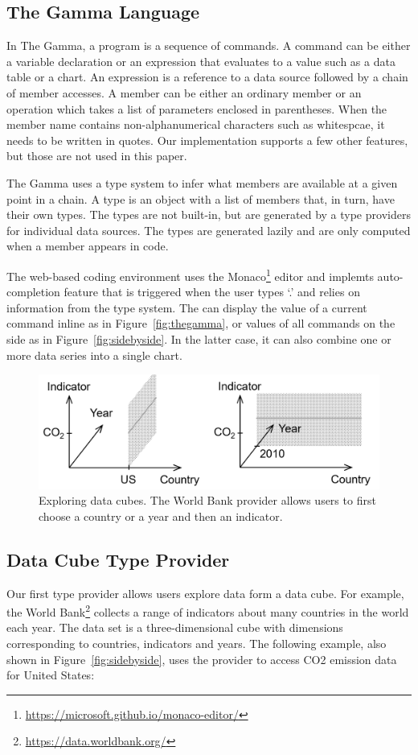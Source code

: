 \documentclass{sigchi}
\begin{document}
\subsection{The Gamma Language}
In The Gamma, a program is a sequence of commands. A command can be either a variable declaration
or an expression that evaluates to a value such as a data table or a chart.
An expression is a reference to a data source followed by a chain of member accesses.
A member can be either an ordinary member or an operation which takes a list of parameters
enclosed in parentheses. When the member name contains non-alphanumerical characters such as
whitespcae, it needs to be written in quotes. Our implementation supports a few other features,
but those are not used in this paper.

The Gamma uses a type system to infer what members are available at a given point in a chain.
A type is an object with a list of members that, in turn, have their own types.
The types are not built-in, but are generated by a type providers for individual data sources.
The types are generated lazily and are only computed when a member appears in code.

The web-based coding environment uses the Monaco\footnote{\url{https://microsoft.github.io/monaco-editor/}}
editor and implemts auto-completion feature that is triggered when the user types `.' and relies
on information from the type system. The can display the value of a current command inline
as in Figure~\ref{fig:thegamma}, or values of all commands on the side as in Figure~\ref{fig:sidebyside}.
In the latter case, it can also combine one or more data series into a single chart.

\begin{figure}
\centering
\includegraphics[scale=0.28]{figures/cubetp}
\caption{Exploring data cubes. The World Bank provider allows users to first choose
  a country or a year and then an indicator.}
\label{fig:cubetp}
\end{figure}

\subsection{Data Cube Type Provider}
Our first type provider allows users explore data form a data cube. For example, the World
Bank\footnote{\url{https://data.worldbank.org/}} collects a range of indicators about many
countries in the world each year. The data set is a three-dimensional cube with dimensions
corresponding to countries, indicators and years. The following example, also shown in
Figure~\ref{fig:sidebyside}, uses the provider to access CO2 emission data for United States:
\end{document}
